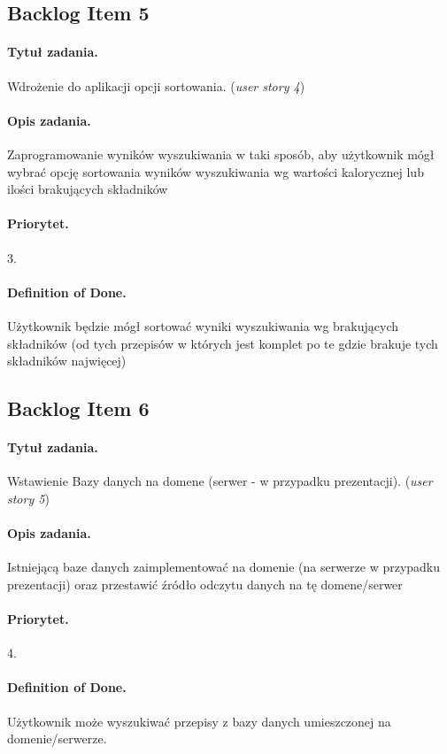 \documentclass[a4paper]{article}
\begin{document}
\subsection{Backlog Item 5}
\paragraph{Tytuł zadania.} Wdrożenie do aplikacji opcji sortowania. (\textit{user story 4})
\paragraph{Opis zadania.} Zaprogramowanie wyników wyszukiwania w taki sposób, aby użytkownik mógł wybrać opcję sortowania wyników wyszukiwania wg wartości kalorycznej lub ilości brakujących składników
\paragraph{Priorytet.} 3.
\paragraph{Definition of Done.} Użytkownik będzie mógł sortować wyniki wyszukiwania wg brakujących składników (od tych przepisów w których jest komplet po te gdzie brakuje tych składników najwięcej)

\subsection{Backlog Item 6}
\paragraph{Tytuł zadania.} Wstawienie Bazy danych na domene (serwer - w przypadku prezentacji). (\textit{user story 5})
\paragraph{Opis zadania.} Istniejącą baze danych zaimplementować na domenie (na serwerze w przypadku prezentacji) oraz przestawić źródło odczytu danych na tę domene/serwer
\paragraph{Priorytet.} 4.
\paragraph{Definition of Done.} Użytkownik może wyszukiwać przepisy z bazy danych umieszczonej na domenie/serwerze.
\end{document}

